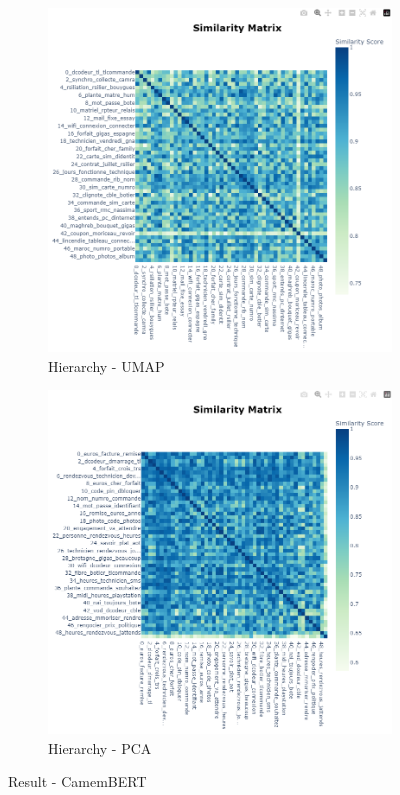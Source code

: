 \begin{figure}[H]
\begin{subfigure}{0.43\textwidth}
        \includegraphics[width=\linewidth]{images/results/cam/hierachy_umap.png}
        \caption{Hierarchy - UMAP}
    \end{subfigure}
    \begin{subfigure}{0.43\textwidth}
        \includegraphics[width=\linewidth]{images/results/cam/hierachy_pca.png}
        \caption{Hierarchy - PCA}
    \end{subfigure}

    
    \caption{Result - CamemBERT}
    \label{fig:result_mini}
\end{figure}

